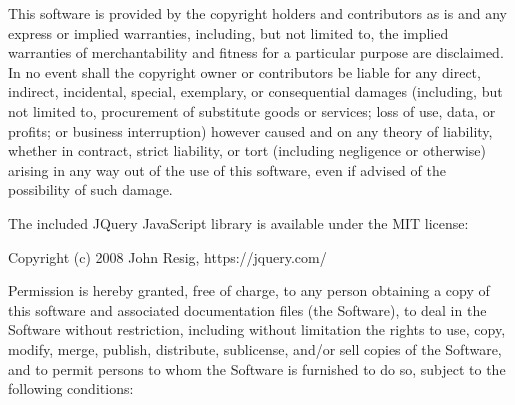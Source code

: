 \documentclass[letterpaper,10pt,english]{sphinxmanual}
\begin{document}
\begin{sphinxVerbatim}[commandchars=\\\{\}]
    This software is provided by the copyright holders and
    contributors \PYGZdq{}as is\PYGZdq{} and any express or implied warranties,
    including, but not limited to, the implied warranties of
    merchantability and fitness for a particular purpose are
    disclaimed. In no event shall the copyright owner or contributors
    be liable for any direct, indirect, incidental, special,
    exemplary, or consequential damages (including, but not limited
    to, procurement of substitute goods or services; loss of use,
    data, or profits; or business interruption) however caused and on
    any theory of liability, whether in contract, strict liability, or
    tort (including negligence or otherwise) arising in any way out of
    the use of this software, even if advised of the possibility of
    such damage.
\PYGZhy{}\PYGZhy{}\PYGZhy{}\PYGZhy{}\PYGZhy{}\PYGZhy{}\PYGZhy{}\PYGZhy{}\PYGZhy{}\PYGZhy{}\PYGZhy{}\PYGZhy{}\PYGZhy{}\PYGZhy{}\PYGZhy{}\PYGZhy{}\PYGZhy{}\PYGZhy{}\PYGZhy{}\PYGZhy{}\PYGZhy{}\PYGZhy{}\PYGZhy{}\PYGZhy{}\PYGZhy{}\PYGZhy{}\PYGZhy{}\PYGZhy{}\PYGZhy{}\PYGZhy{}\PYGZhy{}\PYGZhy{}\PYGZhy{}\PYGZhy{}\PYGZhy{}\PYGZhy{}\PYGZhy{}\PYGZhy{}\PYGZhy{}\PYGZhy{}\PYGZhy{}\PYGZhy{}\PYGZhy{}\PYGZhy{}\PYGZhy{}\PYGZhy{}\PYGZhy{}\PYGZhy{}\PYGZhy{}\PYGZhy{}\PYGZhy{}\PYGZhy{}\PYGZhy{}\PYGZhy{}\PYGZhy{}\PYGZhy{}\PYGZhy{}\PYGZhy{}\PYGZhy{}\PYGZhy{}\PYGZhy{}\PYGZhy{}\PYGZhy{}\PYGZhy{}\PYGZhy{}\PYGZhy{}\PYGZhy{}\PYGZhy{}\PYGZhy{}\PYGZhy{}

The included JQuery JavaScript library is available under the MIT
license:

\PYGZhy{}\PYGZhy{}\PYGZhy{}\PYGZhy{}\PYGZhy{}\PYGZhy{}\PYGZhy{}\PYGZhy{}\PYGZhy{}\PYGZhy{}\PYGZhy{}\PYGZhy{}\PYGZhy{}\PYGZhy{}\PYGZhy{}\PYGZhy{}\PYGZhy{}\PYGZhy{}\PYGZhy{}\PYGZhy{}\PYGZhy{}\PYGZhy{}\PYGZhy{}\PYGZhy{}\PYGZhy{}\PYGZhy{}\PYGZhy{}\PYGZhy{}\PYGZhy{}\PYGZhy{}\PYGZhy{}\PYGZhy{}\PYGZhy{}\PYGZhy{}\PYGZhy{}\PYGZhy{}\PYGZhy{}\PYGZhy{}\PYGZhy{}\PYGZhy{}\PYGZhy{}\PYGZhy{}\PYGZhy{}\PYGZhy{}\PYGZhy{}\PYGZhy{}\PYGZhy{}\PYGZhy{}\PYGZhy{}\PYGZhy{}\PYGZhy{}\PYGZhy{}\PYGZhy{}\PYGZhy{}\PYGZhy{}\PYGZhy{}\PYGZhy{}\PYGZhy{}\PYGZhy{}\PYGZhy{}\PYGZhy{}\PYGZhy{}\PYGZhy{}\PYGZhy{}\PYGZhy{}\PYGZhy{}\PYGZhy{}\PYGZhy{}\PYGZhy{}\PYGZhy{}
Copyright (c) 2008 John Resig, https://jquery.com/

Permission is hereby granted, free of charge, to any person obtaining
a copy of this software and associated documentation files (the
\PYGZdq{}Software\PYGZdq{}), to deal in the Software without restriction, including
without limitation the rights to use, copy, modify, merge, publish,
distribute, sublicense, and/or sell copies of the Software, and to
permit persons to whom the Software is furnished to do so, subject to
the following conditions:


\end{sphinxVerbatim}
\end{document}
